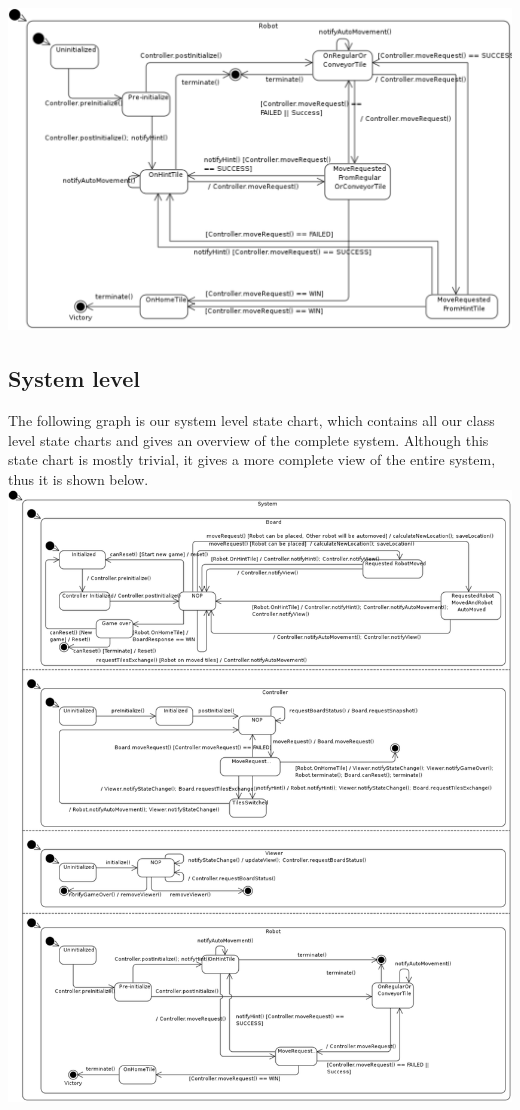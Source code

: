 	\includegraphics[width=\linewidth]{statecharts/robot.pdf}

\subsection{System level}
	The following graph is our system level state chart, which contains all our class level state charts and gives an overview of the complete system. Although this state chart is mostly trivial, it gives a more complete view of the entire system, thus it is shown below.\\

	\includegraphics[width=\linewidth]{statecharts/system.pdf}
	
